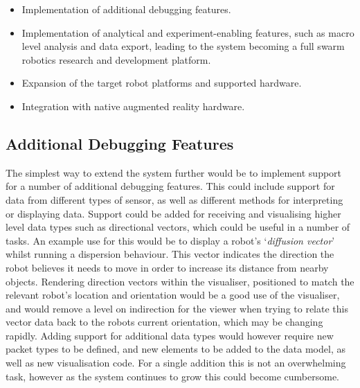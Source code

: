 \begin{itemize}
 \item Implementation of additional debugging features.
 \item Implementation of analytical and experiment-enabling features, such as macro level analysis and data export, leading to the system becoming a full swarm robotics research and development platform.
 \item Expansion of the target robot platforms and supported hardware.
 \item Integration with native augmented reality hardware.
\end{itemize}


\subsection{Additional Debugging Features}

The simplest way to extend the system further would be to implement support for a number of additional debugging features. This could include support for data from different types of sensor, as well as different methods for interpreting or displaying data. Support could be added for receiving and visualising higher level data types such as directional vectors, which could be useful in a number of tasks. An example use for this would be to display a robot's `\textit{diffusion vector}' whilst running a dispersion behaviour. This vector indicates the direction the robot believes it needs to move in order to increase its distance from nearby objects. Rendering direction vectors within the visualiser, positioned to match the relevant robot's location and orientation would be a good use of the visualiser, and would remove a level on indirection for the viewer when trying to relate this vector data back to the robots current orientation, which may be changing rapidly. Adding support for additional data types would however require new packet types to be defined, and new elements to be added to the data model, as well as new visualisation code. For a single addition this is not an overwhelming task, however as the system continues to grow this could become cumbersome.


